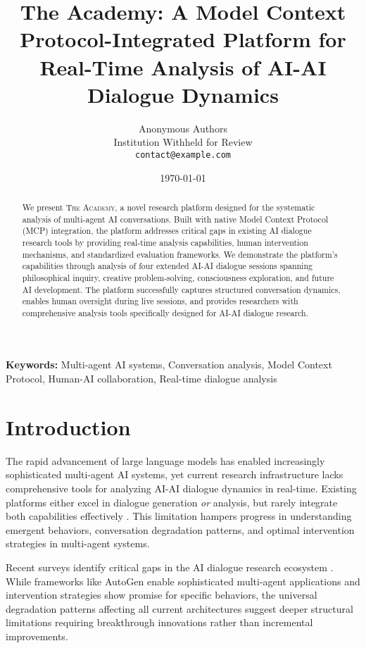 \documentclass{article}
\title{The Academy: A Model Context Protocol-Integrated Platform for Real-Time Analysis of AI-AI Dialogue Dynamics}
\author{
    Anonymous Authors\\
    Institution Withheld for Review\\
    \texttt{contact@example.com}
}
\date{\today}
\newcommand{\theacademy}{\textsc{The Academy}}
\newcommand{\mcp}{\textsc{MCP}}
\begin{document}
\maketitle

\begin{abstract}
We present \theacademy{}, a novel research platform designed for the systematic analysis of multi-agent AI conversations. Built with native Model Context Protocol (\mcp{}) integration, the platform addresses critical gaps in existing AI dialogue research tools by providing real-time analysis capabilities, human intervention mechanisms, and standardized evaluation frameworks. We demonstrate the platform's capabilities through analysis of four extended AI-AI dialogue sessions spanning philosophical inquiry, creative problem-solving, consciousness exploration, and future AI development. The platform successfully captures structured conversation dynamics, enables human oversight during live sessions, and provides researchers with comprehensive analysis tools specifically designed for AI-AI dialogue research.
\end{abstract}

\textbf{Keywords:} Multi-agent AI systems, Conversation analysis, Model Context Protocol, Human-AI collaboration, Real-time dialogue analysis

\section{Introduction}

The rapid advancement of large language models has enabled increasingly sophisticated multi-agent AI systems, yet current research infrastructure lacks comprehensive tools for analyzing AI-AI dialogue dynamics in real-time. Existing platforms either excel in dialogue generation \emph{or} analysis, but rarely integrate both capabilities effectively \citep{wu2023autogen, li2023camel}. This limitation hampers progress in understanding emergent behaviors, conversation degradation patterns, and optimal intervention strategies in multi-agent systems.

Recent surveys identify critical gaps in the AI dialogue research ecosystem \citep{chen2023chatarena}. While frameworks like AutoGen enable sophisticated multi-agent applications and intervention strategies show promise for specific behaviors, the universal degradation patterns affecting all current architectures suggest deeper structural limitations requiring breakthrough innovations rather than incremental improvements.
\end{document}
